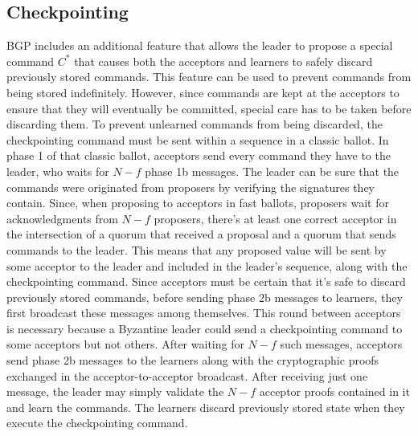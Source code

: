 \subsection{Checkpointing} BGP includes an additional feature that allows the leader to propose a special command $C^*$ that causes both the acceptors and learners to safely discard previously stored commands. This feature can be used to prevent commands from being stored indefinitely. However, since commands are kept at the acceptors to ensure that they will eventually be committed, special care has to be taken before discarding them. To prevent unlearned commands from being discarded, the checkpointing command must be sent within a sequence in a classic ballot. In phase 1 of that classic ballot, acceptors send every command they have to the leader, who waits for $N-f$ phase 1b messages. The leader can be sure that the commands were originated from proposers by verifying the signatures they contain. Since, when proposing to acceptors in fast ballots, proposers wait for acknowledgments from $N-f$ proposers, there's at least one correct acceptor in the intersection of a quorum that received a proposal and a quorum that sends commands to the leader. This means that any proposed value will be sent by some acceptor to the leader and included in the leader's sequence, along with the checkpointing command. Since acceptors must be certain that it's safe to discard previously stored commands, before sending phase 2b messages to learners, they first broadcast these messages among themselves. This round between acceptors is necessary because a Byzantine leader could send a checkpointing command to some acceptors but not others. After waiting for $N-f$ such messages, acceptors send phase 2b messages to the learners along with the cryptographic proofs exchanged in the acceptor-to-acceptor broadcast. After receiving just one message, the leader may simply validate the $N-f$ acceptor proofs contained in it and learn the commands. The learners discard previously stored state when they execute the checkpointing command.
